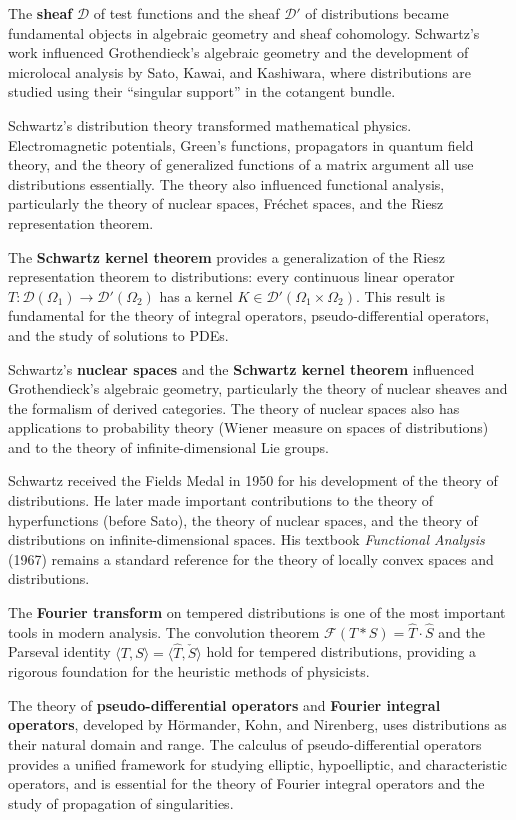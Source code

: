 The \textbf{sheaf} $\mathcal{D}$ of test functions and the sheaf $\mathcal{D}'$ of distributions became fundamental objects in algebraic geometry and sheaf cohomology. Schwartz's work influenced Grothendieck's algebraic geometry and the development of microlocal analysis by Sato, Kawai, and Kashiwara, where distributions are studied using their ``singular support'' in the cotangent bundle.

Schwartz's distribution theory transformed mathematical physics. Electromagnetic potentials, Green's functions, propagators in quantum field theory, and the theory of generalized functions of a matrix argument all use distributions essentially. The theory also influenced functional analysis, particularly the theory of nuclear spaces, Fr\'echet spaces, and the Riesz representation theorem.

The \textbf{Schwartz kernel theorem} provides a generalization of the Riesz representation theorem to distributions: every continuous linear operator $T: \mathcal{D}(\Omega_1) \to \mathcal{D}'(\Omega_2)$ has a kernel $K \in \mathcal{D}'(\Omega_1 \times \Omega_2)$. This result is fundamental for the theory of integral operators, pseudo-differential operators, and the study of solutions to PDEs.

Schwartz's \textbf{nuclear spaces} and the \textbf{Schwartz kernel theorem} influenced Grothendieck's algebraic geometry, particularly the theory of nuclear sheaves and the formalism of derived categories. The theory of nuclear spaces also has applications to probability theory (Wiener measure on spaces of distributions) and to the theory of infinite-dimensional Lie groups.

Schwartz received the Fields Medal in 1950 for his development of the theory of distributions. He later made important contributions to the theory of hyperfunctions (before Sato), the theory of nuclear spaces, and the theory of distributions on infinite-dimensional spaces. His textbook \emph{Functional Analysis} (1967) remains a standard reference for the theory of locally convex spaces and distributions.

The \textbf{Fourier transform} on tempered distributions is one of the most important tools in modern analysis. The convolution theorem $\mathcal{F}(T * S) = \hat{T} \cdot \hat{S}$ and the Parseval identity $\langle T, S \rangle = \langle \hat{T}, \check{S} \rangle$ hold for tempered distributions, providing a rigorous foundation for the heuristic methods of physicists.

The theory of \textbf{pseudo-differential operators} and \textbf{Fourier integral operators}, developed by H\"ormander, Kohn, and Nirenberg, uses distributions as their natural domain and range. The calculus of pseudo-differential operators provides a unified framework for studying elliptic, hypoelliptic, and characteristic operators, and is essential for the theory of Fourier integral operators and the study of propagation of singularities.

